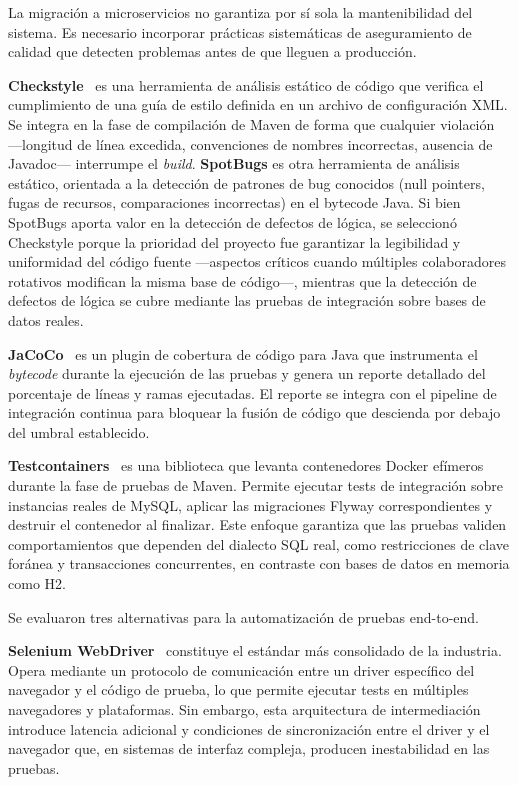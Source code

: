 La migraci\'{o}n a microservicios no garantiza por s\'{i} sola la mantenibilidad del sistema. Es necesario incorporar pr\'{a}cticas sistem\'{a}ticas de aseguramiento de calidad que detecten problemas antes de que lleguen a producci\'{o}n.

\textbf{Checkstyle}~\cite{checkstyle2024} es una herramienta de an\'{a}lisis est\'{a}tico de c\'{o}digo que verifica el cumplimiento de una gu\'{i}a de estilo definida en un archivo de configuraci\'{o}n XML. Se integra en la fase de compilaci\'{o}n de Maven de forma que cualquier violaci\'{o}n ---longitud de l\'{i}nea excedida, convenciones de nombres incorrectas, ausencia de Javadoc--- interrumpe el \textit{build}. \textbf{SpotBugs} es otra herramienta de an\'{a}lisis est\'{a}tico, orientada a la detecci\'{o}n de patrones de bug conocidos (null pointers, fugas de recursos, comparaciones incorrectas) en el bytecode Java. Si bien SpotBugs aporta valor en la detecci\'{o}n de defectos de l\'{o}gica, se seleccion\'{o} Checkstyle porque la prioridad del proyecto fue garantizar la legibilidad y uniformidad del c\'{o}digo fuente ---aspectos cr\'{i}ticos cuando m\'{u}ltiples colaboradores rotativos modifican la misma base de c\'{o}digo---, mientras que la detecci\'{o}n de defectos de l\'{o}gica se cubre mediante las pruebas de integraci\'{o}n sobre bases de datos reales.

\textbf{JaCoCo}~\cite{jacoco2024} es un plugin de cobertura de c\'{o}digo para Java que instrumenta el \textit{bytecode} durante la ejecuci\'{o}n de las pruebas y genera un reporte detallado del porcentaje de l\'{i}neas y ramas ejecutadas. El reporte se integra con el pipeline de integraci\'{o}n continua para bloquear la fusi\'{o}n de c\'{o}digo que descienda por debajo del umbral establecido.

\textbf{Testcontainers}~\cite{testcontainers2024} es una biblioteca que levanta contenedores Docker ef\'{i}meros durante la fase de pruebas de Maven. Permite ejecutar tests de integraci\'{o}n sobre instancias reales de MySQL, aplicar las migraciones Flyway correspondientes y destruir el contenedor al finalizar. Este enfoque garantiza que las pruebas validen comportamientos que dependen del dialecto SQL real, como restricciones de clave for\'{a}nea y transacciones concurrentes, en contraste con bases de datos en memoria como H2.

Se evaluaron tres alternativas para la automatizaci\'{o}n de pruebas end-to-end.

\textbf{Selenium WebDriver}~\cite{selenium2024} constituye el est\'{a}ndar m\'{a}s consolidado de la industria. Opera mediante un protocolo de comunicaci\'{o}n entre un driver espec\'{i}fico del navegador y el c\'{o}digo de prueba, lo que permite ejecutar tests en m\'{u}ltiples navegadores y plataformas. Sin embargo, esta arquitectura de intermediaci\'{o}n introduce latencia adicional y condiciones de sincronizaci\'{o}n entre el driver y el navegador que, en sistemas de interfaz compleja, producen inestabilidad en las pruebas.

